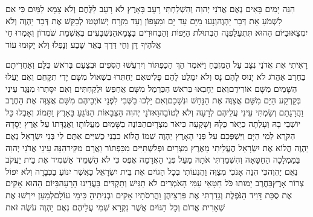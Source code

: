 \documentclass[../main/main.tex]{subfiles}
\begin{document}
\begin{multicols}{\ncols}
הִנֵּה יָמִים בָּאִים נְאֻם אֲדֹנַי יְהוִה וְהִשְׁלַחְתִּי רָעָב בָּאָרֶץ לֹא רָעָב לַלֶּחֶם וְלֹא צָמָא לַמַּיִם כִּי אִם לִשְׁמֹעַ אֵת דְּבַר\SubEnd{} יַהְוֶה\PreVerseSpace{}וְנָעוּ מִיָּם עַד יָם וּמִצָּפוֹן וְעַד מִזְרָח יְשׁוֹטְטוּ לְבַקֵּשׁ אֶת דְּבַר יַהְוֶה וְלֹא יִמְצָאוּ\PreVerseSpace{}בַּיּוֹם הַהוּא תִּתְעַלַּפְנָה הַבְּתוּלֹת הַיָּפוֹת וְהַבַּחוּרִים בַּצָּמָא\PreVerseSpace{}הַנִּשְׁבָּעִים בְּאֲשִׁמַת\SubEnd{} שֹׁמְרוֹן וְאָמְרוּ חֵי אֱלֹהֶיךָ דָּן וְחֵי דֶּרֶךְ בְּאֵר שָׁבַע וְנָפְלוּ וְלֹא יָקוּמוּ עוֹד\OpenSection{}\par
{}רָאִיתִי אֶת אֲדֹנַי נִצָּב עַל הַמִּזְבֵּחַ וַיֹּאמֶר הַךְ הַכַּפְתּוֹר וְיִרְעֲשׁוּ הַסִּפִּים וּבְצַעַם בְּרֹאשׁ כֻּלָּם וְאַחֲרִיתָם בַּחֶרֶב אֶהֱרֹג לֹא יָנוּס לָהֶם נָס וְלֹא יִמָּלֵט לָהֶם פָּלִיט\PreVerseSpace{}אִם יַחְתְּרוּ בִשְׁאוֹל מִשָּׁם יָדִי תִקָּחֵם וְאִם יַעֲלוּ הַשָּׁמַיִם מִשָּׁם אוֹרִידֵם\PreVerseSpace{}וְאִם יֵחָבְאוּ בְּרֹאשׁ הַכַּרְמֶל מִשָּׁם אֲחַפֵּשׂ וּלְקַחְתִּים וְאִם יִסָּתְרוּ מִנֶּגֶד עֵינַי בְּקַרְקַע הַיָּם מִשָּׁם אֲצַוֶּה אֶת הַנָּחָשׁ וּנְשָׁכָם\PreVerseSpace{}וְאִם יֵלְכוּ בַשְּׁבִי לִפְנֵי אֹיְבֵיהֶם מִשָּׁם אֲצַוֶּה אֶת הַחֶרֶב וַהֲרָגָתַם וְשַׂמְתִּי עֵינִי עֲלֵיהֶם לְרָעָה וְלֹא לְטוֹבָה\PreVerseSpace{}וַאדֹנָי יְהוִה הַצְּבָאוֹת הַנּוֹגֵעַ בָּאָרֶץ וַתָּמוֹג וְאָבְלוּ כָּל יוֹשְׁבֵי בָהּ וְעָלְתָה כַיְאֹר כֻּלָּהּ וְשָׁקְעָה כִּיאֹר מִצְרָיִם\PreVerseSpace{}הַבּוֹנֶה בַשָּׁמַיִם מַעֲלוֹתָו וַאֲגֻדָּתוֹ עַל אֶרֶץ יְסָדָהּ הַקֹּרֵא לְמֵי הַיָּם וַיִּשְׁפְּכֵם עַל פְּנֵי הָאָרֶץ יַהְוֶה שְׁמוֹ \ClosedSection{}הֲלוֹא כִבְנֵי כֻשִׁיִּים אַתֶּם לִי בְּנֵי יִשְׂרָאֵל נְאֻם יַהְוֶה הֲלוֹא אֶת יִשְׂרָאֵל הֶעֱלֵיתִי מֵאֶרֶץ מִצְרַיִם וּפְלִשְׁתִּיִּים מִכַּפְתּוֹר וַאֲרָם מִקִּיר\PreVerseSpace{}הִנֵּה עֵינֵי אֲדֹנַי יְהוִה בַּמַּמְלָכָה הַחַטָּאָה וְהִשְׁמַדְתִּי אֹתָהּ מֵעַל פְּנֵי הָאֲדָמָה אֶפֶס כִּי לֹא הַשְׁמֵיד אַשְׁמִיד אֶת בֵּית יַעֲקֹב נְאֻם יַהְוֶה\PreVerseSpace{}כִּי הִנֵּה אָנֹכִי מְצַוֶּה וַהֲנִעוֹתִי בְכָל הַגּוֹיִם אֶת בֵּית יִשְׂרָאֵל כַּאֲשֶׁר יִנּוֹעַ בַּכְּבָרָה וְלֹא יִפּוֹל צְרוֹר אָרֶץ\PreVerseSpace{}בַּחֶרֶב יָמוּתוּ כֹּל חַטָּאֵי עַמִּי הָאֹמְרִים לֹא תַגִּישׁ וְתַקְדִּים בַּעֲדֵינוּ הָרָעָה\PreVerseSpace{}בַּיּוֹם הַהוּא אָקִים אֶת סֻכַּת דָּוִיד הַנֹּפֶלֶת וְגָדַרְתִּי אֶת פִּרְצֵיהֶן וַהֲרִסֹתָיו אָקִים וּבְנִיתִיהָ כִּימֵי עוֹלָם\PreVerseSpace{}לְמַעַן יִירְשׁוּ אֶת שְׁאֵרִית אֱדוֹם וְכָל הַגּוֹיִם אֲשֶׁר נִקְרָא שְׁמִי עֲלֵיהֶם נְאֻם יַהְוֶה עֹשֶׂה זֹּאת\OpenSection{}\par

\end{multicols}
\end{document}
